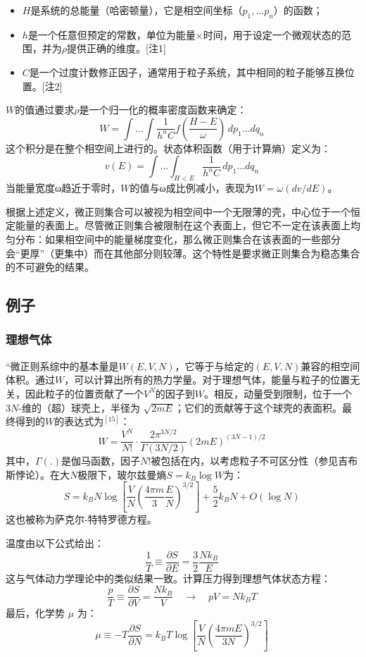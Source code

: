 \begin{itemize}
\item \(H\)是系统的总能量（哈密顿量），它是相空间坐标（\(p_1, ... p_n\)）的函数；  
\item \(h\)是一个任意但预定的常数，单位为能量×时间，用于设定一个微观状态的范围，并为\(\rho\)提供正确的维度。[注1]  
\item \(C\)是一个过度计数修正因子，通常用于粒子系统，其中相同的粒子能够互换位置。[注2]  
\end{itemize}
\(W\)的值通过要求\(\rho\)是一个归一化的概率密度函数来确定：
\[
W = \int \ldots \int \frac{1}{h^n C} f\left(\frac{H - E}{\omega}\right) \, dp_1 \ldots dq_n~
\]
这个积分是在整个相空间上进行的。状态体积函数（用于计算熵）定义为：
\[
v(E) = \int \ldots \int_{H < E} \frac{1}{h^n C} \, dp_1 \ldots dq_n~
\]
当能量宽度ω趋近于零时，\(W\)的值与ω成比例减小，表现为\( W = \omega \left(dv/dE\right)\)。

根据上述定义，微正则集合可以被视为相空间中一个无限薄的壳，中心位于一个恒定能量的表面上。尽管微正则集合被限制在这个表面上，但它不一定在该表面上均匀分布：如果相空间中的能量梯度变化，那么微正则集合在该表面的一些部分会“更厚”（更集中）而在其他部分则较薄。这个特性是要求微正则集合为稳态集合的不可避免的结果。
\subsection{例子}
\subsubsection{理想气体}
“微正则系综中的基本量是\( W(E, V, N) \)，它等于与给定的\( (E, V, N) \)兼容的相空间体积。通过\( W \)，可以计算出所有的热力学量。对于理想气体，能量与粒子的位置无关，因此粒子的位置贡献了一个\( V^N \)的因子到\( W \)。相反，动量受到限制，位于一个\( 3N \)-维的（超）球壳上，半径为 \( \sqrt{2mE} \)；它们的贡献等于这个球壳的表面积。最终得到的\( W \)的表达式为\(^[15]\)：
\[
W = \frac{V^N}{N!} \cdot \frac{2\pi^{3N/2}}{\Gamma(3N/2)} \left( 2mE \right)^{(3N-1)/2}~
\]
其中，\( \Gamma(.) \)是伽马函数，因子\( N! \)被包括在内，以考虑粒子不可区分性（参见吉布斯悖论）。在大\( N \)极限下，玻尔兹曼熵\( S = k_B \log W \)为：
\[
S = k_B N \log \left[ \frac{V}{N} \left( \frac{4 \pi m}{3} \frac{E}{N} \right)^{3/2} \right] + \frac{5}{2} k_B N + O(\log N)~
\]
这也被称为萨克尔-特特罗德方程。

温度由以下公式给出：
\[
\frac{1}{T} \equiv \frac{\partial S}{\partial E} = \frac{3}{2} \frac{N k_B}{E}~
\]
这与气体动力学理论中的类似结果一致。计算压力得到理想气体状态方程：
\[
\frac{p}{T} \equiv \frac{\partial S}{\partial V} = \frac{N k_B}{V} \quad \rightarrow \quad pV = N k_B T~
\]
最后，化学势 \( \mu \) 为：
\[
\mu \equiv -T \frac{\partial S}{\partial N} = k_B T \log \left[ \frac{V}{N} \left( \frac{4\pi m E}{3N} \right)^{3/2} \right]~
\]